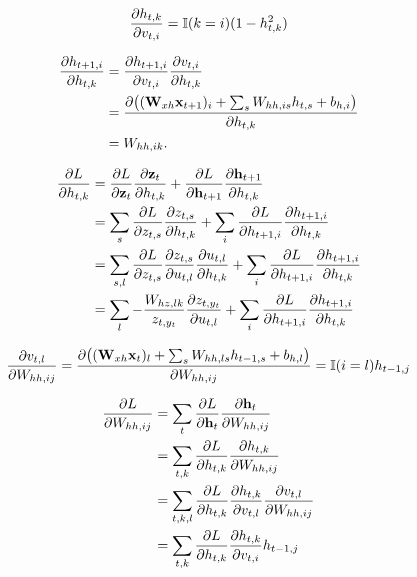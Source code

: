 \begin{equation}
    \frac{\partial h_{t,k}}{\partial v_{t,i}} = {\mathbb{I}}(k=i)(1-h_{t,k}^2)
\end{equation}

\begin{equation}
\begin{split}
    \frac{\partial h_{t+1,i}}{\partial h_{t,k}}
        &= \frac{\partial h_{t+1,i}}{\partial v_{t,i}} \frac{\partial v_{t,i}}{\partial h_{t,k}} \\
        &= \frac{\partial \big(({\mathbf{W}}_{xh}{\mathbf{x}}_{t+1})_i+\sum_s W_{hh,is}h_{t,s}+b_{h,i}\big)}{\partial h_{t,k}} \\
        &= W_{hh,ik}.
\end{split}
\end{equation}

\begin{equation}
\begin{split}
    \frac{\partial L}{\partial h_{t,k}}
        &= \frac{\partial L}{\partial {\mathbf{z}}_t} \frac{\partial {\mathbf{z}}_t}{\partial h_{t,k}} +
            \frac{\partial L}{\partial {\mathbf{h}}_{t+1}} \frac{\partial {\mathbf{h}}_{t+1}}{\partial h_{t,k}} \\
        &= \sum_{s} \frac{\partial L}{\partial z_{t,s}} \frac{\partial z_{t,s}}{\partial h_{t,k}} +
            \sum_i\frac{\partial L}{\partial h_{t+1,i}} \frac{\partial h_{t+1,i}}{\partial h_{t,k}} \\
        &= \sum_{s,l} \frac{\partial L}{\partial z_{t,s}} \frac{\partial z_{t,s}}{\partial u_{t,l}}\frac{\partial u_{t,l}}{\partial h_{t,k}} +
            \sum_i\frac{\partial L}{\partial h_{t+1,i}} \frac{\partial h_{t+1,i}}{\partial h_{t,k}} \\
        &= \sum_{l} -\frac{W_{hz,lk}}{z_{t,{y_t}}} \frac{\partial z_{t,{y_t}}}{\partial u_{t,l}} +
            \sum_i\frac{\partial L}{\partial h_{t+1,i}} \frac{\partial h_{t+1,i}}{\partial h_{t,k}} \\
\end{split}
\end{equation}

\begin{equation}
    \frac{\partial v_{t,l}}{\partial W_{hh,ij}}
        = \frac{\partial \big(({\mathbf{W}}_{xh}{\mathbf{x}}_t)_l+\sum_s W_{hh,ls}h_{t-1,s}+b_{h,l}\big)}{\partial W_{hh,ij}}
        = {\mathbb{I}}(i=l)h_{t-1,j}
\end{equation}

\begin{equation}
\begin{split}
    \frac{\partial L}{\partial W_{hh,ij}}
        &= \sum_t \frac{\partial L}{\partial {\mathbf{h}}_t} \frac{\partial {\mathbf{h}}_t}{\partial W_{hh,ij}} \\
        &= \sum_{t,k} \frac{\partial L}{\partial h_{t,k}} \frac{\partial h_{t,k}}{\partial W_{hh,ij}} \\
        &= \sum_{t,k,l} \frac{\partial L}{\partial h_{t,k}} \frac{\partial h_{t,k}}{\partial v_{t,l}}\frac{\partial v_{t,l}}{\partial W_{hh,ij}} \\
        &= \sum_{t,k} \frac{\partial L}{\partial h_{t,k}} \frac{\partial h_{t,k}}{\partial v_{t,i}}h_{t-1,j} \\
\end{split}
\end{equation}
